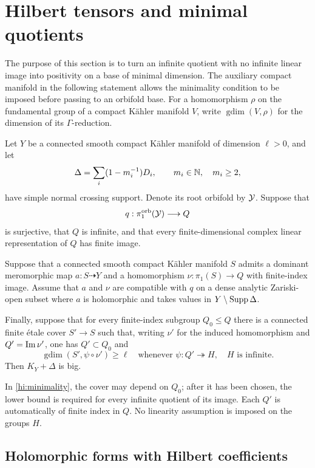 \section{Hilbert tensors and minimal quotients}\label{sec:hilbert}

The purpose of this section is to turn an infinite quotient with no
infinite linear image into positivity on a base of minimal dimension.
The auxiliary compact manifold in the following statement allows the
minimality condition to be imposed before passing to an orbifold base.
For a homomorphism \(\rho\) on the fundamental group of a compact
K\"ahler manifold \(V\), write
\(\operatorname{gdim}(V,\rho)\) for the dimension of its
\(\Gamma\)-reduction.

\begin{theorem}\label{thm:hilbert-positivity}
Let \(Y\) be a connected smooth compact K\"ahler manifold of dimension
\(\ell>0\), and let
\[
 \Delta=\sum_i(1-m_i^{-1})D_i,\qquad m_i\in\mathbb N,\quad m_i\ge2,
\]
have simple normal crossing support. Denote its root orbifold by
\(\mathcal Y\). Suppose that
\[
 q:\pi_1^{\mathrm{orb}}(\mathcal Y)\longrightarrow Q
\]
is surjective, that \(Q\) is infinite, and that every finite-dimensional
complex linear representation of \(Q\) has finite image.

Suppose that a connected smooth compact K\"ahler manifold \(S\) admits
a dominant meromorphic map \(a:S\dashrightarrow Y\) and a homomorphism
\(\nu:\pi_1(S)\to Q\) with finite-index image. Assume that \(a\) and
\(\nu\) are compatible with \(q\) on a dense analytic Zariski-open
subset where \(a\) is holomorphic and takes values in
\(Y\setminus\operatorname{Supp}\Delta\).

Finally, suppose that for every finite-index subgroup \(Q_0\le Q\)
there is a connected finite \'etale cover \(S'\to S\) such that, writing
\(\nu'\) for the induced homomorphism and \(Q'=\operatorname{Im}\nu'\), one has
\(Q'\subset Q_0\) and
\[
 \operatorname{gdim}(S',\psi\circ\nu')\ge\ell
 \quad\text{whenever }\psi:Q'\twoheadrightarrow H,\quad
 H\text{ is infinite}.
 \tag{M}\label{hi:minimality}
\]
Then \(K_Y+\Delta\) is big.
\end{theorem}

In \eqref{hi:minimality}, the cover may depend on \(Q_0\); after it has
been chosen, the lower bound is required for every infinite quotient
of its image. Each \(Q'\) is automatically of finite index in \(Q\).
No linearity assumption is imposed on the groups \(H\).

\subsection{Holomorphic forms with Hilbert coefficients}

